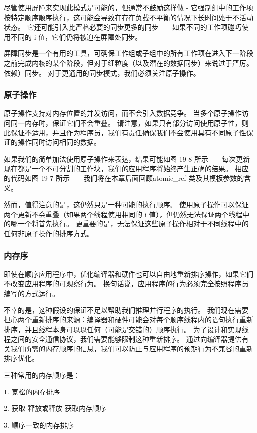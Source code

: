 尽管使用屏障来实现此模式是可能的，但通常不鼓励这样做 - 它强制组中的工作项按特定顺序顺序执行，这可能会导致在存在负载不平衡的情况下长时间处于不活动状态。 它还可能引入比严格必要的同步更多的同步——如果不同的工作项碰巧使用不同的 i 值，它们仍将被迫在屏障处同步。

屏障同步是一个有用的工具，可确保工作组或子组中的所有工作项在进入下一阶段之前完成内核的某个阶段，但对于细粒度（以及潜在的数据同步）来说过于严厉。 依赖）同步。 对于更通用的同步模式，我们必须关注原子操作。

\subsubsection{原子操作}
原子操作支持对内存位置的并发访问，而不会引入数据竞争。 当多个原子操作访问同一内存时，保证它们不会重叠。 请注意，如果只有部分访问使用原子性，则此保证不适用，并且作为程序员，我们有责任确保我们不会使用具有不同原子性保证的操作同时访问相同的数据。

如果我们的简单加法使用原子操作来表达，结果可能如图 19-8 所示——每次更新现在都是一个不可分割的工作块，我们的应用程序将始终产生正确的结果。 相应的代码如图 19-7 所示——我们将在本章后面回顾atomic\_ref 类及其模板参数的含义。

然而，值得注意的是，这仍然只是一种可能的执行顺序。 使用原子操作可以保证两个更新不会重叠（如果两个线程使用相同的 i 值），但仍然无法保证两个线程中的哪一个将首先执行。 更重要的是，无法保证这些原子操作相对于不同线程中的任何非原子操作的排序方式。

\subsubsection{内存序}
即使在顺序应用程序中，优化编译器和硬件也可以自由地重新排序操作，如果它们不改变应用程序的可观察行为。 换句话说，应用程序的行为必须完全按照程序员编写的方式运行。

不幸的是，这种假设的保证不足以帮助我们推理并行程序的执行。 我们现在需要担心两个重新排序的来源：编译器和硬件可能会对每个顺序线程内的语句执行重新排序，并且线程本身可以以任何（可能是交错的）顺序执行。 为了设计和实现线程之间的安全通信协议，我们需要能够限制这种重新排序。 通过向编译器提供有关我们所需的内存顺序的信息，我们可以防止与应用程序的预期行为不兼容的重新排序优化。

三种常用的内存顺序是：

1. 宽松的内存排序

2. 获取-释放或释放-获取内存顺序

3. 顺序一致的内存排序

